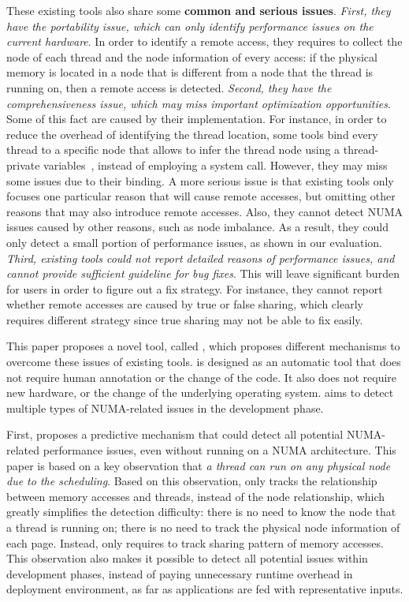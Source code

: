 These existing tools also share some \textbf{common and serious issues}. \textit{First, they have the portability issue, which can only identify performance issues on the current hardware}. 
In order to identify a remote access, they requires to collect the node of each thread and the node information of every access: if the physical memory is located in a node that is different from a node that the thread is running on, then a remote access is detected. \textit{Second, they have the comprehensiveness issue, which may miss important optimization opportunities}. Some of this fact are caused by their implementation. For instance, in order to reduce the overhead of identifying the thread location, some tools bind every thread to a specific node that allows to infer the thread node using a thread-private variables~\cite{XuNuma}, instead of employing a system call.  However, they may miss some issues due to their binding. A more serious issue is that existing tools only focuses one particular reason that will cause remote accesses, but omitting other reasons that may also introduce remote accesses. Also, they cannot detect NUMA issues caused by other reasons, such as node imbalance. As a result, they could only detect a small portion of performance issues, as shown in our evaluation. \textit{Third, existing tools could not report detailed reasons of performance issues, and cannot provide sufficient guideline for bug fixes}. This will leave significant burden for users in order to figure out a fix strategy. For instance, they cannot report whether remote accesses are caused by true or false sharing, which clearly requires different strategy since true sharing may not be able to fix easily.   


This paper proposes a novel tool, called \NP{}, which proposes different mechanisms to overcome these issues of existing tools. \NP{} is designed as an automatic tool that does not require human annotation or the change of the code. It also does not require new hardware, or the change of the underlying operating system. \NP{} aims to detect multiple types of NUMA-related issues in the development phase.

First, \NP{} proposes a predictive mechanism that could detect all potential NUMA-related performance issues, even without running on a NUMA architecture. 
This paper is based on a key observation that \textit{a thread can run on any physical node due to the scheduling}. Based on this observation, \NP{} only tracks the relationship between memory accesses and threads, instead of the node relationship, which greatly simplifies the detection difficulty: there is no need to know the node that a thread is running on; there is no need to track the physical node information of each page. Instead, \NP{} only requires to track sharing pattern of memory accesses. This observation also makes it possible to detect all potential issues within development phases, instead of paying unnecessary runtime overhead in deployment environment, as far as applications are fed with representative inputs. 


